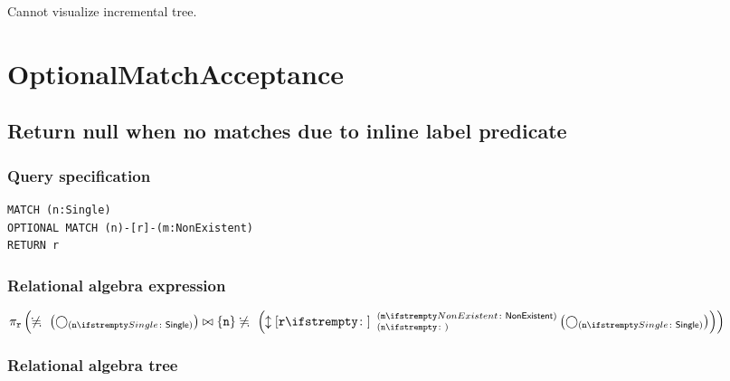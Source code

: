Cannot visualize incremental tree.

\section{OptionalMatchAcceptance}

\subsection{Return null when no matches due to inline label predicate}

\subsubsection*{Query specification}

\begin{lstlisting}
MATCH (n:Single)
OPTIONAL MATCH (n)-[r]-(m:NonExistent)
RETURN r
\end{lstlisting}

\subsubsection*{Relational algebra expression}

$\projection{\var{r}} \left(\alldifferent{} \left(\getvertices{n}{Single}\right) \join \{\var{n}\} \alldifferent{} \left(\expandboth{r}{}{n}{m}{NonExistent} \left(\getvertices{n}{Single}\right)\right)\right)$

\subsubsection*{Relational algebra tree}


